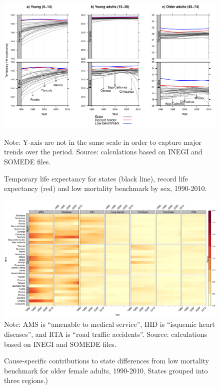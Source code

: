 \documentclass[11.5pt]{article}
\begin{document}
\begin{spacing}{1.5}
\begin{figure}[h!]
\label{Fig_temporary_le}
\centering
\caption{Temporary life expectancy for states (black line), record life
expectancy (red) and low mortality benchmark by sex, 1990-2010.}
\includegraphics[scale=.5]{Figures/Temp_fig.pdf}

Note: Y-axis are not in the same scale in order to capture major trends over the period. Source: calculations based on INEGI and SOMEDE files. 
\end{figure}


\begin{figure}[h!]
\centering
\caption{Cause-specific contributions to state differences from low mortality benchmark for older female adults, 1990-2010. States grouped into three regions.)}
\label{fig:e40_74_females}
\includegraphics[scale=.31]{Figures/Adult_Female_heatmap.pdf}
Note: AMS is ``amenable to medical service'', IHD is ``isquemic heart diseases'', and RTA is ``road traffic accidents''. Source: calculations based on INEGI and SOMEDE files. \end{figure}



\end{spacing}
\end{document}
